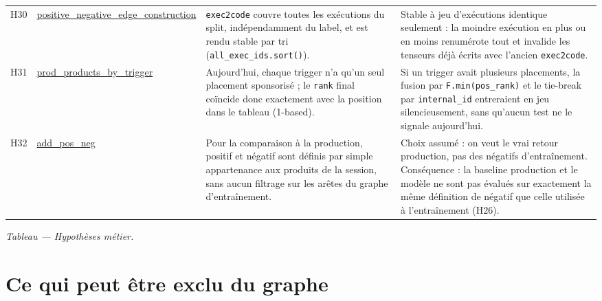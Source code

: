 \documentclass[11pt,a4paper]{article}
\newcommand{\code}[1]{\texttt{\small #1}}
\begin{document}
{\begin{longtable}{@{}l p{2.45cm} p{5.9cm} p{4.5cm}@{}}
\addlinespace
H30 & \url{positive_negative_edge_construction} & \code{exec2code} couvre toutes les exécutions du split, indépendamment du label, et est rendu stable par tri (\code{all\_exec\_ids.sort()}). & Stable à jeu d'exécutions identique seulement : la moindre exécution en plus ou en moins renumérote tout et invalide les tenseurs déjà écrits avec l'ancien \code{exec2code}. \\
\addlinespace
H31 & \url{prod_products_by_trigger} & Aujourd'hui, chaque trigger n'a qu'un seul placement sponsorisé ; le \code{rank} final coïncide donc exactement avec la position dans le tableau (1-based). & Si un trigger avait plusieurs placements, la fusion par \code{F.min(pos\_rank)} et le tie-break par \code{internal\_id} entreraient en jeu silencieusement, sans qu'aucun test ne le signale aujourd'hui. \\
\addlinespace
H32 & \url{add_pos_neg} & Pour la comparaison à la production, positif et négatif sont définis par simple appartenance aux produits de la session, sans aucun filtrage sur les arêtes du graphe d'entraînement. & Choix assumé : on veut le vrai retour production, pas des négatifs d'entraînement. Conséquence : la baseline production et le modèle ne sont pas évalués sur exactement la même définition de négatif que celle utilisée à l'entraînement (H26). \\

\end{longtable}
}
\label{tab:hypotheses}
\begin{center}\footnotesize\itshape Tableau \thetable{} --- Hypothèses métier.\end{center}

\clearpage
\section{Ce qui peut être exclu du graphe}
\label{sec:exclusions}
\end{document}

